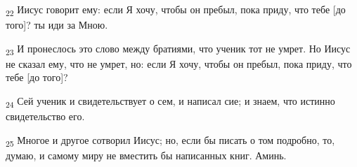 \begin{tcolorbox}
\textsubscript{22} Иисус говорит ему: если Я хочу, чтобы он пребыл, пока приду, что тебе [до того]? ты иди за Мною.
\end{tcolorbox}
\begin{tcolorbox}
\textsubscript{23} И пронеслось это слово между братиями, что ученик тот не умрет. Но Иисус не сказал ему, что не умрет, но: если Я хочу, чтобы он пребыл, пока приду, что тебе [до того]?
\end{tcolorbox}
\begin{tcolorbox}
\textsubscript{24} Сей ученик и свидетельствует о сем, и написал сие; и знаем, что истинно свидетельство его.
\end{tcolorbox}
\begin{tcolorbox}
\textsubscript{25} Многое и другое сотворил Иисус; но, если бы писать о том подробно, то, думаю, и самому миру не вместить бы написанных книг. Аминь.
\end{tcolorbox}
